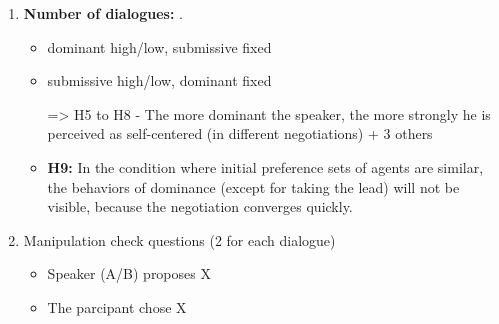 \documentclass{article}
\begin{document}
\begin{enumerate}
		
		\item \textbf{Number of dialogues:} .
		\begin{itemize}
				\item dominant high/low, submissive fixed
				\item submissive high/low, dominant fixed
				
				=> H5 to H8 - The more dominant the speaker, the more strongly he is perceived as self-centered (in different negotiations) + 3 others
				
				\item \textbf{H9:} In the condition where initial preference sets of agents are similar, the behaviors of dominance (except for taking the lead) will not be visible, because the negotiation converges quickly.
				
		\end{itemize}
		

		
		\item Manipulation check questions (2 for each dialogue)
		\begin{itemize}
			\item Speaker (A/B) proposes X
			\item The parcipant chose X 
		\end{itemize}
		
	\end{enumerate}
	
	
\end{document}
